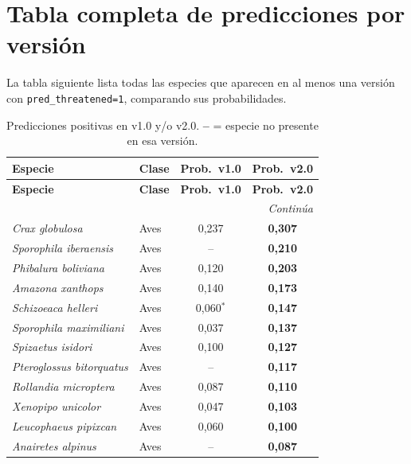 \documentclass[12pt,a4paper]{article}
\begin{document}
\appendix
\section{Tabla completa de predicciones por versión}

La tabla siguiente lista todas las especies que aparecen en al menos una versión con
\texttt{pred\_threatened=1}, comparando sus probabilidades.

\begin{longtable}{p{5cm}lcc}
  \caption{Predicciones positivas en v1.0 y/o v2.0.
           \textbf{--} = especie no presente en esa versión.} \label{tab:pred_full} \\
  \toprule
  \textbf{Especie} & \textbf{Clase} & \textbf{Prob.\ v1.0} & \textbf{Prob.\ v2.0} \\
  \midrule \endfirsthead
  \toprule \textbf{Especie} & \textbf{Clase} & \textbf{Prob.\ v1.0} & \textbf{Prob.\ v2.0} \\ \midrule \endhead
  \midrule \multicolumn{4}{r}{\textit{Continúa}} \\ \endfoot
  \bottomrule \endlastfoot
  \textit{Crax globulosa}            & Aves & 0,237 & \textbf{0,307} \\
  \textit{Sporophila iberaensis}      & Aves & --    & \textbf{0,210} \\
  \textit{Phibalura boliviana}        & Aves & 0,120 & \textbf{0,203} \\
  \textit{Amazona xanthops}           & Aves & 0,140 & \textbf{0,173} \\
  \textit{Schizoeaca helleri}         & Aves & 0,060$^*$ & \textbf{0,147} \\
  \textit{Sporophila maximiliani}     & Aves & 0,037 & \textbf{0,137} \\
  \textit{Spizaetus isidori}          & Aves & 0,100 & \textbf{0,127} \\
  \textit{Pteroglossus bitorquatus}   & Aves & --    & \textbf{0,117} \\
  \textit{Rollandia microptera}       & Aves & 0,087 & \textbf{0,110} \\
  \textit{Xenopipo unicolor}          & Aves & 0,047 & \textbf{0,103} \\
  \textit{Leucophaeus pipixcan}       & Aves & 0,060 & \textbf{0,100} \\
  \textit{Anairetes alpinus}          & Aves & --    & \textbf{0,087} \\

\end{longtable}
\end{document}
